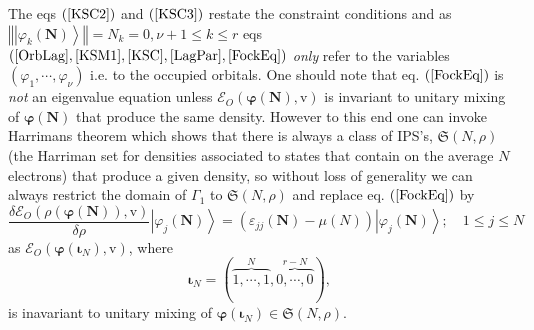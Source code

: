 \documentclass[aps,preprint]{revtex4}%
\begin{document}
The eqs $\left(  \ref{KSC2}\right)  $ and $\left(  \ref{KSC3}\right)  $
restate the constraint conditions and as $\left\Vert \left\vert \varphi
_{k}\left(  \boldsymbol{N}\right)  \right\rangle \right\Vert =N_{k}%
=0,\nu+1\leq k\leq r$ eqs $\left(  \ref{OrbLag},\ref{KSM1},\ref{KSC}%
,\ref{LagPar},\ref{FockEq}\right)  $ \emph{only} refer to the variables
$\left(  \varphi_{1},\cdots,\varphi_{\nu}\right)  $ i.e. to the occupied
orbitals. One should note that eq. $\left(  \ref{FockEq}\right)  $ is
\emph{not }an eigenvalue equation unless $\mathcal{E}_{O}\left(
\boldsymbol{\varphi}\left(  \boldsymbol{N}\right)  ,\mathrm{v}\right)  $ is
invariant to unitary mixing of $\boldsymbol{\varphi}\left(  \boldsymbol{N}%
\right)  $ that produce the same density. However to this end one can invoke
Harrimans theorem \cite{Harriman81} which shows that there is always a class
of IPS's, $\mathfrak{S}\left(  N,\rho\right)  $ (the Harriman set for
densities associated to states that contain on the average $N$ electrons) that
produce a given density, so without loss of generality we can always restrict
the domain of $\Gamma_{1}$ to $\mathfrak{S}\left(  N,\rho\right)  $ and
replace eq. $\left(  \ref{FockEq}\right)  $ by
\begin{equation}
\frac{\delta\mathcal{E}_{O}\left(  \rho\left(  \boldsymbol{\varphi\left(
\boldsymbol{N}\right)  }\right)  \boldsymbol{,}\mathrm{v}\right)  }{\delta
\rho}\left\vert \varphi_{j}\left(  \boldsymbol{N}\right)  \right\rangle
=\left(  \varepsilon_{jj}\left(  \boldsymbol{N}\right)  -\mu\left(  N\right)
\right)  \left\vert \varphi_{j}\left(  \boldsymbol{N}\right)  \right\rangle
;\quad1\leq j\leq N \label{FockHarri}%
\end{equation}
as $\mathcal{E}_{O}\left(  \boldsymbol{\varphi}\left(  \boldsymbol{\iota}%
_{N}\right)  ,\mathrm{v}\right)  $, where
\begin{equation}
\boldsymbol{\iota}_{N}=\left(  \overset{N}{\overbrace{1,\cdots,1}%
},\overset{r-N}{\overbrace{0,\cdots,0}}\right)  ,
\end{equation}
is inavariant to unitary mixing of $\boldsymbol{\varphi}\left(
\boldsymbol{\iota}_{N}\right)  \in\mathfrak{S}\left(  N,\rho\right)  .$
\end{document}
